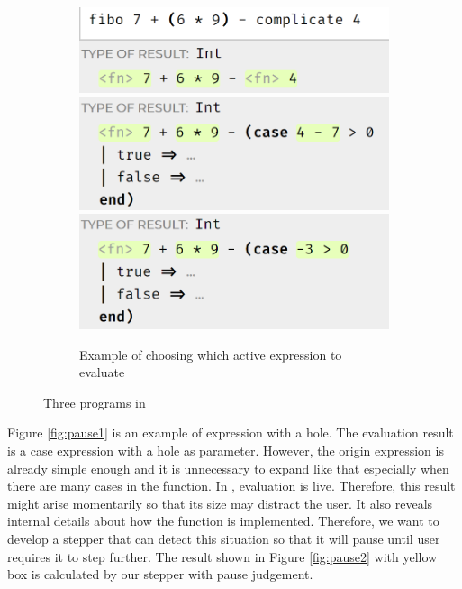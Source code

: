 \begin{figure}[htbp]
\begin{subfigure}[b]{0.3\textwidth}
      \includegraphics[width=\textwidth]{img/interactive1.png}
      \includegraphics[width=\textwidth]{img/interactive2.png}
      \includegraphics[width=\textwidth]{img/interactive3.png}
      \caption{Example of choosing which active expression to evaluate}
      \label{fig:multiple}
  \end{subfigure}
    \caption{Three programs in \Hazel}
    \label{fig:intro_example}
\end{figure}


Figure \ref{fig:pause1} is an example of expression with a hole. The evaluation result is a case expression with a hole as parameter. However, the origin expression is already simple enough and it is unnecessary to expand like that especially when there are many cases in the function. In \Hazel, evaluation is live. Therefore, this result might arise momentarily so that its size may distract the user. It also reveals internal details about how the function is implemented. Therefore, we want to develop a stepper that can detect this situation so that it will pause until user requires it to step further. The result shown in Figure \ref{fig:pause2} with yellow box is calculated by our stepper with pause judgement.

